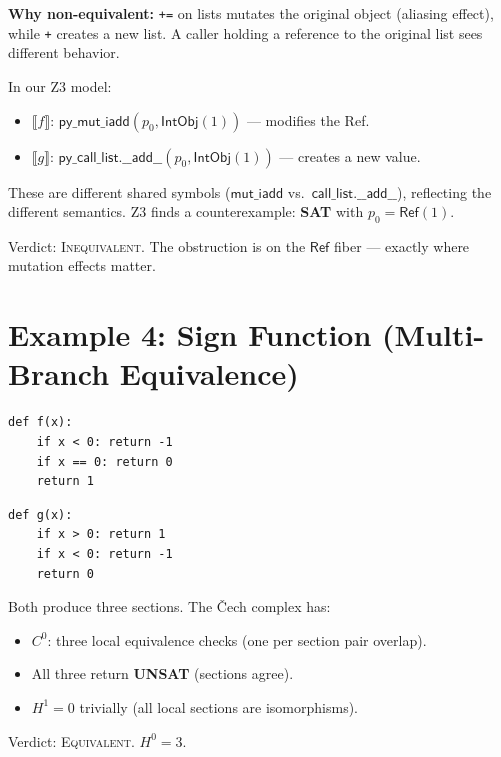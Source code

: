 \documentclass[11pt,a4paper]{report}
\theoremstyle{definition}
\theoremstyle{plain}
\newcommand{\den}[1]{\llbracket #1 \rrbracket}     %
\newcommand{\Hzero}{H^0}
\newcommand{\Hone}{H^1}
\begin{document}
\textbf{Why non-equivalent:} \texttt{+=} on lists mutates the
original object (aliasing effect), while \texttt{+} creates a new
list.  A caller holding a reference to the original list sees
different behavior.

In our Z3 model:
\begin{itemize}
  \item $\den{f}$: $\mathsf{py\_mut\_iadd}(p_0, \mathsf{IntObj}(1))$
    --- modifies the Ref.
  \item $\den{g}$: $\mathsf{py\_call\_list.\_\_add\_\_}(p_0,
    \mathsf{IntObj}(1))$ --- creates a new value.
\end{itemize}

These are different shared symbols ($\mathsf{mut\_iadd}$ vs.\
$\mathsf{call\_list.\_\_add\_\_}$), reflecting the different
semantics.  Z3 finds a counterexample: \textbf{SAT} with
$p_0 = \mathsf{Ref}(1)$.

Verdict: \textsc{Inequivalent}.  The obstruction is on the
$\mathsf{Ref}$ fiber --- exactly where mutation effects matter.

\section{Example 4: Sign Function (Multi-Branch Equivalence)}

\begin{lstlisting}[caption={Sign version A}]
def f(x):
    if x < 0: return -1
    if x == 0: return 0
    return 1
\end{lstlisting}

\begin{lstlisting}[caption={Sign version B}]
def g(x):
    if x > 0: return 1
    if x < 0: return -1
    return 0
\end{lstlisting}

Both produce three sections.  The \v{C}ech complex has:
\begin{itemize}
  \item $C^0$: three local equivalence checks (one per section pair
    overlap).
  \item All three return \textbf{UNSAT} (sections agree).
  \item $\Hone = 0$ trivially (all local sections are isomorphisms).
\end{itemize}

Verdict: \textsc{Equivalent}.  $\Hzero = 3$.


\end{document}
